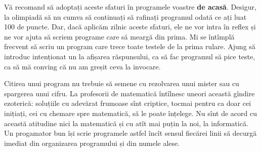 \documentclass[../main.tex]{subfiles}
\begin{document}
Vă recomand să adoptați aceste sfaturi în programele voastre \textbf{de acasă}. Desigur, la olimpiadă să nu cumva să continuați să rafinați programul odată ce ați luat 100 de puncte.  Dar, dacă aplicăm zilnic aceste sfaturi, ele ne vor intra în reflex și ne vor ajuta să scriem programe care să meargă din prima. Mi se întîmplă frecvent să scriu un program care trece toate testele de la prima rulare. Ajung să introduc intenționat un  la afișarea răspunsului, ca să fac programul să pice teste, ca să mă conving că nu am greșit ceva la invocare.

Citirea unui program nu trebuie să semene cu rezolvarea unui mister sau cu spargerea unui cifru. La profesorii de matematică întîlnesc uneori această gîndire ezoterică: soluțiile cu adevărat frumoase sînt criptice, tocmai pentru ca doar cei inițiați, cei cu chemare spre matematică, să le poate înțelege. Nu sînt de acord cu această atitudine nici la matematică și cu atît mai puțin la noi, la informatică. Un progamator bun își scrie programele astfel încît sensul fiecărei linii să decurgă imediat din organizarea programului și din numele alese.
\end{document}
